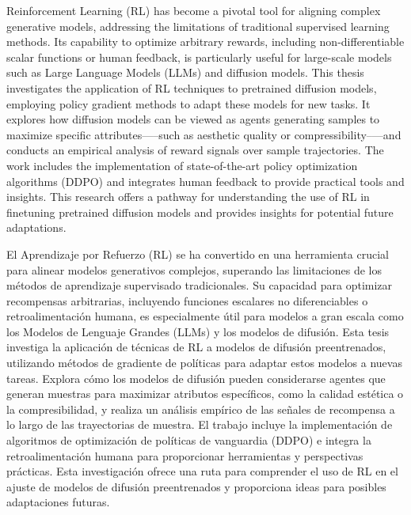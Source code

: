 \documentclass[
	spanish, %
	letterpaper, oneside
]{book}
\begin{document}
\templatePortrait

\templatePagecfg

\begin{abstractd}
	Reinforcement Learning (RL) has become a pivotal tool for aligning complex generative models, addressing the limitations of traditional supervised learning methods. Its capability to optimize arbitrary rewards, including non-differentiable scalar functions or human feedback, is particularly useful for large-scale models such as Large Language Models (LLMs) and diffusion models. This thesis investigates the application of RL techniques to pretrained diffusion models, employing policy gradient methods to adapt these models for new tasks. It explores how diffusion models can be viewed as agents generating samples to maximize specific attributes—--such as aesthetic quality or compressibility--—and conducts an empirical analysis of reward signals over sample trajectories. The work includes the implementation of state-of-the-art policy optimization algorithms (DDPO) and integrates human feedback to provide practical tools and insights. This research offers a pathway for understanding the use of RL in finetuning pretrained diffusion models and provides insights for potential future adaptations.
\end{abstractd}

\begin{abstractdesp}
	El Aprendizaje por Refuerzo (RL) se ha convertido en una herramienta crucial para alinear modelos generativos complejos, superando las limitaciones de los métodos de aprendizaje supervisado tradicionales. Su capacidad para optimizar recompensas arbitrarias, incluyendo funciones escalares no diferenciables o retroalimentación humana, es especialmente útil para modelos a gran escala como los Modelos de Lenguaje Grandes (LLMs) y los modelos de difusión. Esta tesis investiga la aplicación de técnicas de RL a modelos de difusión preentrenados, utilizando métodos de gradiente de políticas para adaptar estos modelos a nuevas tareas. Explora cómo los modelos de difusión pueden considerarse agentes que generan muestras para maximizar atributos específicos, como la calidad estética o la compresibilidad, y realiza un análisis empírico de las señales de recompensa a lo largo de las trayectorias de muestra. El trabajo incluye la implementación de algoritmos de optimización de políticas de vanguardia (DDPO) e integra la retroalimentación humana para proporcionar herramientas y perspectivas prácticas. Esta investigación ofrece una ruta para comprender el uso de RL en el ajuste de modelos de difusión preentrenados y proporciona ideas para posibles adaptaciones futuras.
\end{abstractdesp}
\end{document}
